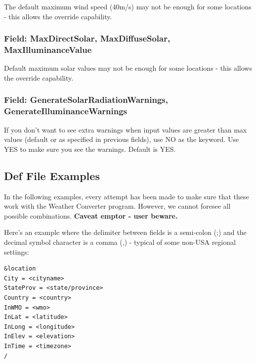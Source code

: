 The default maximum wind speed (40m/s) may not be enough for some locations - this allows the override capability.

\subsubsection{Field: MaxDirectSolar, MaxDiffuseSolar, MaxIlluminanceValue}\label{field-maxdirectsolar-maxdiffusesolar-maxilluminancevalue}

Default maximum solar values may not be enough for some locations - this allows the override capability.

\subsubsection{Field: GenerateSolarRadiationWarnings, GenerateIlluminanceWarnings}\label{field-generatesolarradiationwarnings-generateilluminancewarnings}

If you don't want to see extra warnings when input values are greater than max values (default or as specified in previous fields), use NO as the keyword. Use YES to make sure you see the warnings. Default is YES.

\subsection{Def File Examples}\label{def-file-examples}

In the following examples, every attempt has been made to make sure that these work with the Weather Converter program. However, we cannot foresee all possible combinations. \textbf{Caveat emptor - user beware.}

Here's an example where the delimiter between fields is a semi-colon (;) and the decimal symbol character is a comma (,) - typical of some non-USA regional settings:

\begin{lstlisting}
&location
City = <cityname>
StateProv = <state/province>
Country = <country>
InWMO = <wmo>
InLat = <latitude>
InLong = <longitude>
InElev = <elevation>
InTime = <timezone>
/
\end{lstlisting}

